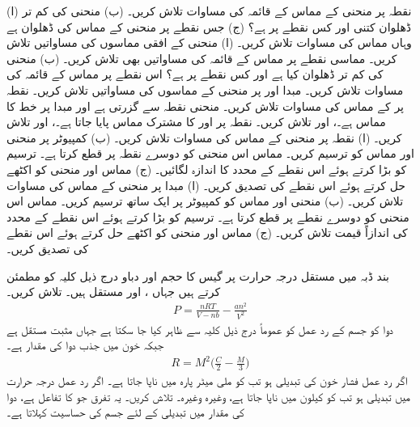 (ا) نقطہ  پر منحنی  کے مماس کے قائمہ کی مساوات تلاش کریں۔ (ب)   منحنی کی کم تر ڈھلوان  کتنی اور کس نقطے پر ہے؟ (ج) جس نقطے پر منحنی کے مماس کی ڈھلوان  ہے وہاں مماس کی مساوات تلاش کریں۔
(ا) منحنی  کے افقی مماسوں کی مساواتیں تلاش کریں۔ مماسی نقطے پر مماس کے قائمہ کی مساواتیں بھی تلاش کریں۔ (ب) منحنی کی کم تر ڈھلوان کیا ہے اور کس نقطے پر ہے؟ اس نقطے پر مماس کے قائمہ کی مساوات تلاش کریں۔
مبدا اور  پر منحنی  کے مماسوں کی مساواتیں تلاش کریں۔ 
نقطہ  پر  کے مماس کی مساوات تلاش کریں۔
منحنی  نقطہ  سے گزرتی ہے اور مبدا پر خط  کا مماس ہے۔،  اور  تلاش کریں۔
نقطہ  پر  اور  کا مشترک مماس پایا جاتا ہے۔،  اور  تلاش کریں۔
(ا)  نقطہ  پر منحنی  کے مماس کی مساوات تلاش کریں۔ (ب) کمپیوٹر پر منحنی اور مماس کو ترسیم کریں۔  مماس اس منحنی کو دوسرے نقطہ پر قطع کرتا ہے۔ ترسیم کو بڑا کرتے ہوئے اس نقطے کے  محدد کا اندازہ لگائیں۔ (ج) مماس اور منحنی کو اکٹھے حل کرتے ہوئے اس نقطے کی تصدیق کریں۔
(ا) مبدا پر منحنی  کے مماس کی مساوات تلاش کریں۔ (ب) منحنی اور مماس کو کمپیوٹر پر ایک ساتھ ترسیم کریں۔ مماس اس منحنی کو دوسرے نقطے پر  قطع کرتا ہے۔ ترسیم کو بڑا کرتے ہوئے اس نقطے کے محدد کی اندازاً قیمت تلاش کریں۔ (ج) مماس اور منحنی کو اکٹھے حل کرتے ہوئے  اس نقطے کی تصدیق کریں۔

\quad
بند ڈبہ میں مستقل درجہ حرارت  پر گیس کا حجم  اور دباو  درج ذیل کلیہ کو مطمئن کرتے ہیں جہاں ،  اور  مستقل ہیں۔  تلاش کریں۔
\begin{align*}
P=\frac{nRT}{V-nb}-\frac{an^2}{V^2}
\end{align*}
\quad
دوا کو جسم کے رد عمل  کو عموماً درج ذیل کلیہ  سے ظاہر کیا جا سکتا ہے جہاں  مثبت مستقل ہے جبکہ  خون میں جذب دوا کی مقدار ہے۔
\begin{align*}
R=M^2\big(\frac{C}{2}-\frac{M}{3}\big)
\end{align*}
اگر رد عمل فشار خون کی تبدیلی ہو تب  کو ملی میٹر پارہ میں ناپا جاتا ہے۔ اگر رد عمل درجہ حرارت میں تبدیلی ہو تب  کو کیلون میں ناپا جاتا ہے، وغیرہ وغیرہ۔  تلاش کریں۔ یہ تفرق جو  کا تفاعل ہے،  دوا کی  مقدار میں تبدیلی کے لئے جسم کی  حساسیت کہلاتا ہے۔ 

